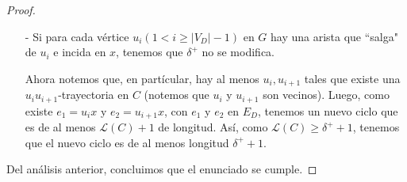 \documentclass{article}
\begin{document}
\begin{enumerate}
\begin{proof}
\begin{itemize}
        \item[-] Si para cada vértice $u_i(1 < i \geq |V_D| -1)$ en $G$ hay
          una arista que ``salga" de $u_i$ e incida en $x$, tenemos que $\delta^+$
          no se modifica.

          Ahora notemos que, en partícular, hay al menos
          $u_i, u_{i +1}$ tales que existe una $u_i u_{i +1}$-trayectoria en $C$
          (notemos que $u_i$ y $u_{i +1}$ son vecinos).
          Luego, como existe $e_1 = u_i x$ y $e_{2} = u_{i +1} x$, con $e_1$
          y $e_2$ en $E_D$, tenemos un nuevo ciclo que es de al menos
          $\mathcal{L}(C) +1$ de longitud.
          Así, como $\mathcal{L}(C) \geq \delta^+ +1$, tenemos que el nuevo ciclo es
          de al menos longitud $\delta^+ +1$.
      \end{itemize}
      Del análisis anterior, concluimos que el enunciado se cumple.
    \end{proof}
  \end{enumerate}
\end{document}
